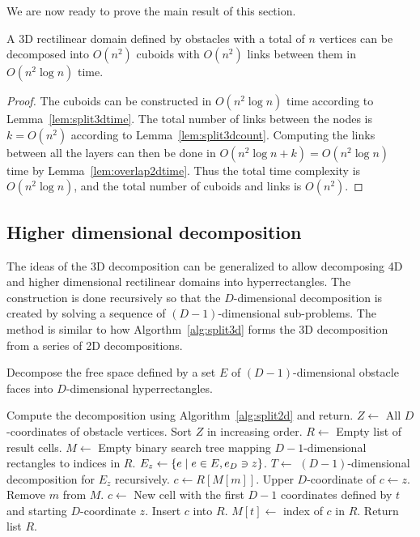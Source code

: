 \documentclass[english,gradu]{tktltiki2018}
\begin{document}
We are now ready to prove the main result of this section.

\begin{theo}\label{theo:split3dtime}A 3D rectilinear domain defined by obstacles with a total of $n$ vertices can be decomposed into $O(n^2)$ cuboids with $O(n^2)$ links between them in $O(n^2\log n)$ time.\end{theo}
\begin{proof}
The cuboids can be constructed in $O(n^2\log n)$ time according to Lemma~\ref{lem:split3dtime}.
The total number of links between the nodes is $k=O(n^2)$ according to Lemma~\ref{lem:split3dcount}.
Computing the links between all the layers can then be done in $O(n^2\log n+k)=O(n^2\log n)$ time by Lemma~\ref{lem:overlap2dtime}.
Thus the total time complexity is $O(n^2\log n)$, and the total number of cuboids and links is $O(n^2)$.
\end{proof}



\subsection{Higher dimensional decomposition}\label{sec:splitdd}

The ideas of the 3D decomposition can be generalized to allow decomposing 4D and higher dimensional rectilinear domains into hyperrectangles.
The construction is done recursively so that the $D$-dimensional decomposition is created by solving a sequence of $(D-1)$-dimensional sub-problems.
The method is similar to how Algorthm~\ref{alg:split3d} forms the 3D decomposition from a series of 2D decompositions.

\begin{alg}\label{alg:splitdd}
Decompose the free space defined by a set $E$ of $(D-1)$-dimensional obstacle faces into $D$-dimensional hyperrectangles.
\begin{algorithmic}
	\State Compute the decomposition using Algorithm~\ref{alg:split2d} and return.
\EndIf
\State $Z\gets$ All $D$-coordinates of obstacle vertices.
\State Sort $Z$ in increasing order.
\State $R\gets$ Empty list of result cells.
\State $M\gets$ Empty binary search tree mapping $D-1$-dimensional rectangles to indices in $R$.
	\State $E_z\gets\left\{e \mid e\in E, e_D\ni z\right\}$.
	\State $T\gets$ $(D-1)$-dimensional decomposition for $E_z$ recursively.
		\State $c\gets R[M[m]]$.
		\State Upper $D$-coordinate of $c\gets z$.
		\State Remove $m$ from $M$.
	\EndFor
		\State $c\gets$ New cell with the first $D-1$ coordinates defined by $t$ and starting $D$-coordinate $z$.
		\State Insert $c$ into $R$.
		\State $M[t]\gets$ index of $c$ in $R$.
	\EndFor
\EndFor
\State Return list $R$.
\end{algorithmic}
\end{alg}
\end{document}
